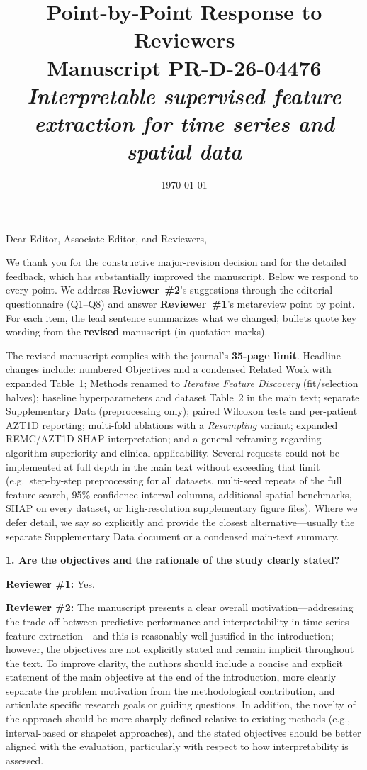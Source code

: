 \documentclass[11pt]{article}
\title{Point-by-Point Response to Reviewers\\[0.3em]
\large Manuscript PR-D-26-04476\\
\textit{Interpretable supervised feature extraction for time series and spatial data}}
\date{\today}
\newcommand{\rcbothq}[3]{%
  \begin{reviewerbox}\textbf{#1}\par\smallskip\textbf{Reviewer \#1:} #2\par\smallskip%
  \textbf{Reviewer \#2:} #3\end{reviewerbox}}
\begin{document}
\maketitle

\noindent Dear Editor, Associate Editor, and Reviewers,

We thank you for the constructive major-revision decision and for the detailed feedback, which has
substantially improved the manuscript. Below we respond to every point. We address
\textbf{Reviewer~\#2}'s suggestions through the editorial questionnaire (Q1--Q8) and answer
\textbf{Reviewer~\#1}'s metareview point by point. For each item, the lead sentence summarizes what
we changed; bullets quote key wording from the \textbf{revised} manuscript (in quotation marks).

The revised manuscript complies with the journal's \textbf{35-page limit}. Headline changes include: 
numbered Objectives and a condensed Related Work with expanded Table~1;
Methods renamed to \emph{Iterative Feature Discovery} (fit/selection halves); baseline
hyperparameters and dataset Table~2 in the main text; separate Supplementary Data (preprocessing
only); paired Wilcoxon tests and per-patient AZT1D reporting; multi-fold ablations with a
\emph{Resampling} variant; expanded REMC/AZT1D SHAP interpretation; 
and a general reframing regarding algorithm superiority and clinical applicability. 
Several requests could not be implemented at full depth in the main text without
exceeding that limit (e.g.\
step-by-step preprocessing for all datasets, multi-seed repeats of the full feature search,
95\% confidence-interval columns, additional spatial benchmarks, SHAP on every dataset, or
high-resolution supplementary figure files). Where we defer detail, we say so explicitly and provide
the closest alternative---usually the separate Supplementary Data document or a condensed main-text
summary.

\rcbothq{1. Are the objectives and the rationale of the study clearly stated?}{Yes.}
{The manuscript presents a clear overall motivation---addressing the trade-off between predictive
performance and interpretability in time series feature extraction---and this is reasonably well
justified in the introduction; however, the objectives are not explicitly stated and remain
implicit throughout the text.
To improve clarity, the authors should include a concise and explicit statement of the main
objective at the end of the introduction, more clearly separate the problem motivation from the
methodological contribution, and articulate specific research goals or guiding questions.
In addition, the novelty of the approach should be more sharply defined relative to existing
methods (e.g., interval-based or shapelet approaches), and the stated objectives should be
better aligned with the evaluation, particularly with respect to how interpretability is assessed.}
\end{document}
